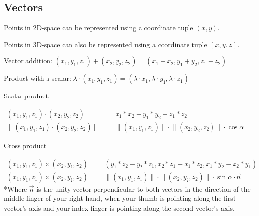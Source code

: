 \subsection{Vectors}
Points in 2D-space can be represented using a coordinate tuple $(x, y)$.

Points in 3D-space can also be represented using a coordinate tuple $(x, y, z)$. 

Vector addition:
\begin{math}
(x_1, y_1, z_1) + (x_2, y_2, z_2) = (x_1+x_2, y_1+y_2, z_1+z_2)
\end{math}

Product with a scalar:
\begin{math}
\lambda \cdot (x_1, y_1, z_1) = (\lambda \cdot x_1, \lambda \cdot y_1, \lambda \cdot z_1)
\end{math}

Scalar product:

\begin{math}
\begin{array}{rcl}
(x_1, y_1, z_1) \cdot (x_2, y_2, z_2)  & =  & x_1*x_2+y_1*y_2+z_1*z_2 \\
\lVert (x_1, y_1, z_1) \cdot (x_2, y_2, z_2) \rVert &  = & \lVert (x_1, y_1, z_1) \rVert \cdot \lVert (x_2, y_2, z_2) \rVert \cdot \cos{\alpha}
\end{array}
\end{math}

Cross product:

\begin{math}
\begin{array}{rcl}
(x_1, y_1, z_1) \times (x_2, y_2, z_2) & = & (y_1*z_2-y_2*z_1, x_2*z_1-x_1*z_2, x_1*y_2-x_2*y_1) \\

 (x_1, y_1, z_1) \times (x_2, y_2, z_2)  &  = & \lVert (x_1, y_1, z_1) \rVert \cdot \lVert (x_2, y_2, z_2) \rVert \cdot \sin{\alpha} \cdot \vec{n}
\end{array}
\end{math}
*Where $\vec{n}$ is the unity vector perpendicular to both vectors in the direction of the middle finger of your right hand, when your thumb is pointing along the first vector's axis and your index finger is pointing along the second vector's axis.
